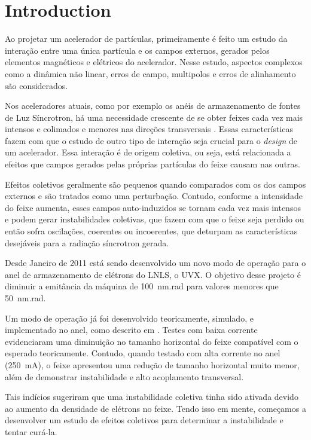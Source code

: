 \chapter{Introduction} 	

Ao projetar um acelerador de partículas, primeiramente é feito um estudo da interação entre uma única partícula e os campos externos, gerados pelos elementos magnéticos e elétricos do acelerador. Nesse estudo, aspectos complexos como a dinâmica não linear, erros de campo, multipolos e erros de alinhamento são considerados.

Nos aceleradores atuais, como por exemplo os anéis de armazenamento de fontes de Luz Síncrotron, há uma necessidade crescente de se obter feixes cada vez mais intensos e colimados e menores nas direções transversais . Essas características fazem com que o estudo de outro tipo de interação seja crucial para o
\textit{design} de um acelerador. Essa interação é de origem coletiva, ou seja, está relacionada a efeitos que campos gerados pelas próprias partículas do feixe causam nas outras.

Efeitos coletivos geralmente são pequenos quando comparados com os dos campos externos e são tratados como uma perturbação. Contudo, conforme a intensidade do feixe aumenta, esses campos auto-induzidos se tornam cada vez mais intensos e podem gerar instabilidades coletivas, que fazem com que o feixe seja perdido
ou então sofra oscilações, coerentes ou incoerentes, que deturpam as características desejáveis para a radiação síncrotron gerada.

Desde Janeiro de 2011 está sendo desenvolvido um novo modo de operação para o anel de armazenamento de elétrons do LNLS, o UVX. O objetivo desse projeto é diminuir a emitância da máquina de 100~nm.rad para valores menores que 50~nm.rad.

Um modo de operação já foi desenvolvido teoricamente, simulado, e implementado no anel, como descrito em \cite{Fernando}. Testes com baixa corrente evidenciaram uma diminuição no tamanho horizontal do feixe compatível com o esperado teoricamente. Contudo, quando testado com alta corrente no anel (250~mA), o feixe apresentou uma redução de tamanho horizontal muito menor, além de demonstrar instabilidade e alto acoplamento transversal.

Tais indícios sugeriram que uma instabilidade coletiva tinha sido ativada devido ao aumento da densidade de elétrons no feixe. Tendo isso em mente, começamos a desenvolver um estudo de efeitos coletivos para determinar a instabilidade e tentar curá-la.

